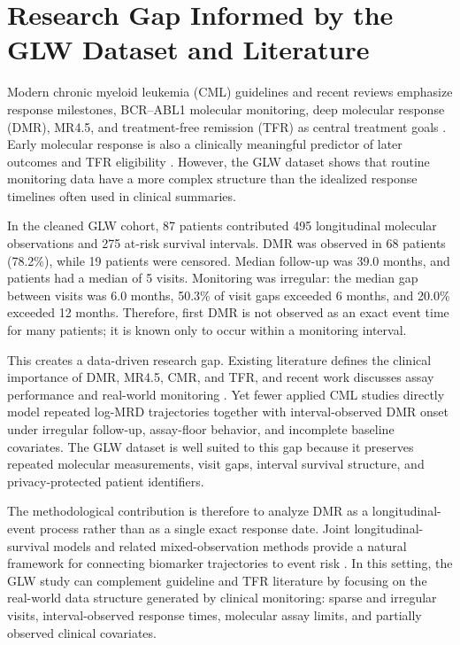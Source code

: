 \section{Research Gap Informed by the GLW Dataset and Literature}

Modern chronic myeloid leukemia (CML) guidelines and recent reviews emphasize response milestones, BCR--ABL1 molecular monitoring, deep molecular response (DMR), MR4.5, and treatment-free remission (TFR) as central treatment goals \cite{Hochhaus2020ELN,Jabbour2025JAMAReview,Haddad2026Algorithms,Senapati2023CMLManagement}. Early molecular response is also a clinically meaningful predictor of later outcomes and TFR eligibility \cite{Hughes2014EarlyMolecularResponse,Rasekh2026TFRPredictor,Ono2026MR45}. However, the GLW dataset shows that routine monitoring data have a more complex structure than the idealized response timelines often used in clinical summaries.

In the cleaned GLW cohort, 87 patients contributed 495 longitudinal molecular observations and 275 at-risk survival intervals. DMR was observed in 68 patients (78.2\%), while 19 patients were censored. Median follow-up was 39.0 months, and patients had a median of 5 visits. Monitoring was irregular: the median gap between visits was 6.0 months, 50.3\% of visit gaps exceeded 6 months, and 20.0\% exceeded 12 months. Therefore, first DMR is not observed as an exact event time for many patients; it is known only to occur within a monitoring interval.

This creates a data-driven research gap. Existing literature defines the clinical importance of DMR, MR4.5, CMR, and TFR, and recent work discusses assay performance and real-world monitoring \cite{Kim2026BCRABLqPCR,Verweij2026RemoteMonitoring,Parihar2026TFR,Atallah2021TFR}. Yet fewer applied CML studies directly model repeated log-MRD trajectories together with interval-observed DMR onset under irregular follow-up, assay-floor behavior, and incomplete baseline covariates. The GLW dataset is well suited to this gap because it preserves repeated molecular measurements, visit gaps, interval survival structure, and privacy-protected patient identifiers.

The methodological contribution is therefore to analyze DMR as a longitudinal-event process rather than as a single exact response date. Joint longitudinal-survival models and related mixed-observation methods provide a natural framework for connecting biomarker trajectories to event risk \cite{Wulfsohn1997JointModel,Rizopoulos2016JMbayes,Lovblom2026MixedObservationJointModel,Niu2026QuantileJointModel}. In this setting, the GLW study can complement guideline and TFR literature by focusing on the real-world data structure generated by clinical monitoring: sparse and irregular visits, interval-observed response times, molecular assay limits, and partially observed clinical covariates.

